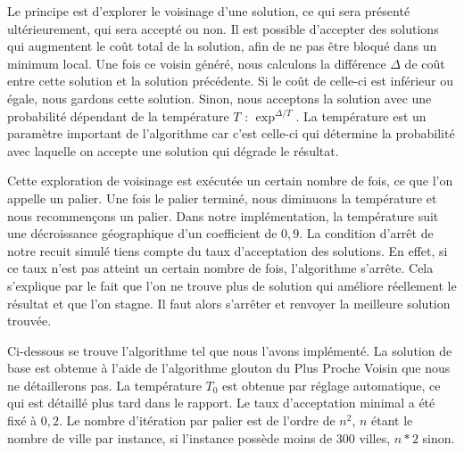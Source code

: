 \documentclass{article}
\begin{document}
Le principe est d'explorer le voisinage d'une solution, ce qui sera présenté ultérieurement, qui sera accepté ou non.
Il est possible d'accepter des solutions qui augmentent le coût total de la solution, afin de ne pas être bloqué dans un minimum local.\newline
Une fois ce voisin généré, nous calculons la différence $\Delta$ de coût entre cette solution et la solution précédente.
Si le coût de celle-ci est inférieur ou égale, nous gardons cette solution.
Sinon, nous acceptons la solution avec une probabilité dépendant de la température $T$ : $\exp^{\Delta / T}$.\newline
La température est un paramètre important de l'algorithme car c'est celle-ci qui détermine la probabilité avec laquelle on accepte une solution qui dégrade le résultat.

Cette exploration de voisinage est exécutée un certain nombre de fois, ce que l'on appelle un palier.
Une fois le palier terminé, nous diminuons la température et nous recommençons un palier.
Dans notre implémentation, la température suit une décroissance géographique d'un coefficient de $0,9$.
La condition d'arrêt de notre recuit simulé tiens compte du taux d'acceptation des solutions.
En effet, si ce taux n'est pas atteint un certain nombre de fois, l'algorithme s'arrête.
Cela s'explique par le fait que l'on ne trouve plus de solution qui améliore réellement le résultat et que l'on stagne. Il faut alors s'arrêter et renvoyer la meilleure solution trouvée.

Ci-dessous se trouve l'algorithme tel que nous l'avons implémenté.
La solution de base est obtenue à l'aide de l'algorithme glouton du Plus Proche Voisin que nous ne détaillerons pas.
La température $T_0$ est obtenue par réglage automatique, ce qui est détaillé plus tard dans le rapport.
Le taux d'acceptation minimal a été fixé à $0,2$.
Le nombre d'itération par palier est de l'ordre de $n^2$, $n$ étant le nombre de ville par instance, si l'instance possède moins de 300 villes, $n*2$ sinon.
\end{document}
